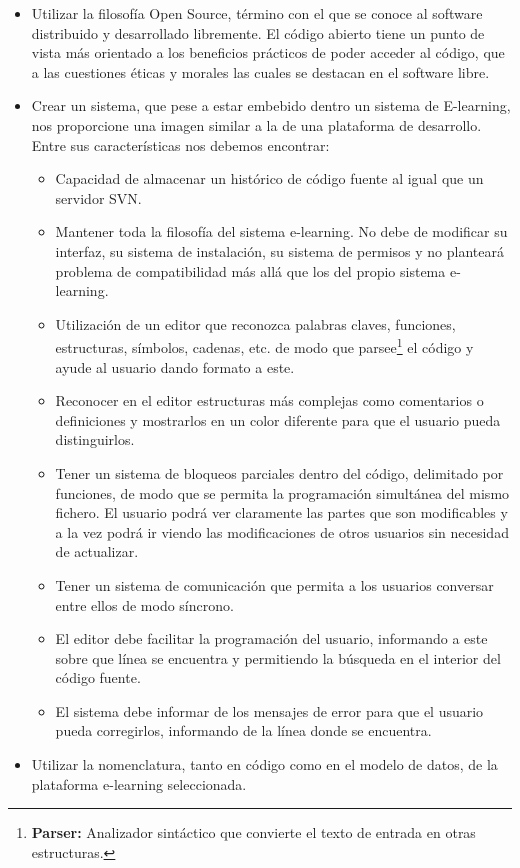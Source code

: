 \begin{itemize}
	\item Utilizar la filosofía Open Source, término con el que se conoce al software distribuido y desarrollado libremente. El código abierto tiene un punto de vista más orientado a los beneficios prácticos de poder acceder al código, que a las cuestiones éticas y morales las cuales se destacan en el software libre.
	\item Crear un sistema, que pese a estar embebido dentro un sistema de E-learning, nos proporcione una imagen similar a la de una plataforma de desarrollo. Entre sus características nos debemos encontrar:
	\begin{itemize}
		\item Capacidad de almacenar un histórico de código fuente al igual que un servidor SVN.
		\item Mantener toda la filosofía del sistema e-learning. No debe de modificar su interfaz, su sistema de instalación, su sistema de permisos y no planteará problema de compatibilidad más allá que los del propio sistema e-learning.
		\item Utilización de un editor que reconozca palabras claves, funciones, estructuras, símbolos, cadenas, etc. de modo que parsee\footnote{\textbf{Parser: } Analizador sintáctico que convierte el texto de entrada en otras estructuras.} el código y ayude al usuario dando formato a este.
		\item Reconocer en el editor estructuras más complejas como comentarios o definiciones y mostrarlos en un color diferente para que el usuario pueda distinguirlos.
		\item Tener un sistema de bloqueos parciales dentro del código, delimitado por funciones, de modo que se permita la programación simultánea del mismo fichero. El usuario podrá ver claramente las partes que son modificables y a la vez podrá ir viendo las modificaciones de otros usuarios sin necesidad de actualizar. 
		\item Tener un sistema de comunicación que permita a los usuarios conversar entre ellos de modo síncrono.
		\item El editor debe facilitar la programación del usuario, informando a este sobre que línea se encuentra y permitiendo la búsqueda en el interior del código fuente.
		\item El sistema debe informar de los mensajes de error para que el usuario pueda corregirlos, informando de la línea donde se encuentra.
	\end{itemize}
	\item Utilizar la nomenclatura, tanto en código como en el modelo de datos, de la plataforma e-learning seleccionada.
\end{itemize}

